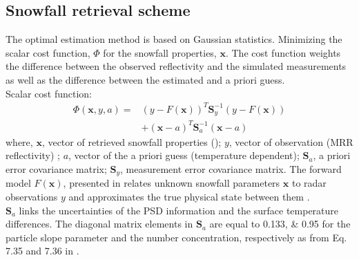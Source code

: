 \subsection{Snowfall retrieval scheme}\label{sec:ret_scheme}
The optimal estimation method is based on Gaussian statistics. Minimizing the scalar cost function, $\Phi$ for the snowfall properties, $\mathbf{x}$. The cost function weights the difference between the observed reflectivity and the simulated measurements as well as the difference between the estimated and a priori guess. %
\\
Scalar cost function:
\begin{equation}
\begin{split}
\Phi(\mathbf{x},y,a) = & (y- F(\mathbf{x}))^T \mathbf{S}_y^{-1} 			(y-F(\mathbf{x})) \\
&+(\mathbf{x}-a)^T \mathbf{S}_{a}^{-1} (\mathbf{x}-a)
\end{split} \label{eq:scalar_cost_fct}
\end{equation}
where, $\mathbf{x}$, vector of retrieved snowfall properties (); $y$, vector of observation (MRR reflectivity) ; $a$, vector of the a priori guess (temperature dependent); $\mathbf{S}_a$, a priori error covariance matrix; $\mathbf{S}_y$, measurement error covariance matrix. The forward model $F(\mathbf{x})$, presented in  relates unknown snowfall parameters $\mathbf{x}$ to radar observations $y$ and approximates the true physical state between them \citep{wood_estimating_2014,cooper_variational_2017}.
%
\\
$\mathbf{S}_a$ links the uncertainties of the PSD information and the surface temperature differences. The diagonal matrix elements in $\mathbf{S}_a$ are equal to \numlist{0.133;0.95} for the particle slope parameter and the number concentration, respectively as from  Eq. 7.35 and 7.36 in \cite{wood_estimation_2011}. \\
